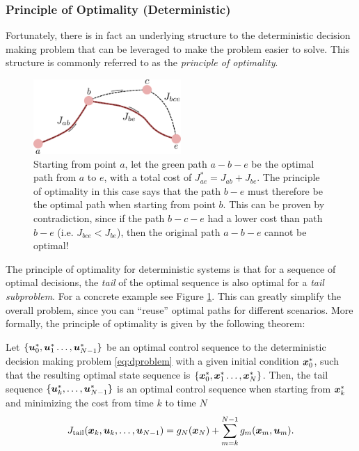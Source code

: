 \subsubsection{Principle of Optimality (Deterministic)}
Fortunately, there is in fact an underlying structure to the deterministic decision making problem that can be leveraged to make the problem easier to solve. This structure is commonly referred to as the \textit{principle of optimality}.
\begin{figure}[ht]
    \centering
    \includegraphics[width=0.5\textwidth]{tex/figs/ch22_figs/princopt1.png}
    \caption{Starting from point $a$, let the green path $a-b-e$ be the optimal path from $a$ to $e$, with a total cost of $J^*_{ae} = J_{ab}+J_{be}$. The principle of optimality in this case says that the path $b-e$ must therefore be the optimal path when starting from point $b$. This can be proven by contradiction, since if the path $b-c-e$ had a lower cost than path $b-e$ (i.e. $J_{bce} < J_{be}$), then the original path $a-b-e$ cannot be optimal!}
    \label{fig:princopt1}
\end{figure}

The principle of optimality for deterministic systems is that for a sequence of optimal decisions, the \textit{tail} of the optimal sequence is also optimal for a \textit{tail subproblem}. For a concrete example see Figure \ref{fig:princopt1}. This can greatly simplify the overall problem, since you can ``reuse'' optimal paths for different scenarios. More formally, the principle of optimality is given by the following theorem:
\begin{theorem}
Let $\{\bm{u}_0^*, \bm{u}_1^* \dots, \bm{u}_{N-1}^*\}$ be an optimal control sequence to the deterministic decision making problem \eqref{eq:dproblem} with a given initial condition $\bm{x}^*_0$, such that the resulting optimal state sequence is $\{\bm{x}_0^*, \bm{x}_1^* \dots, \bm{x}_{N}^*\}$. Then, the tail sequence $\{\bm{u}_k^*, \dots, \bm{u}_{N-1}^*\}$ is an optimal control sequence when starting from $\bm{x}^*_k$ and minimizing the cost from time $k$ to time $N$
\begin{equation*}
J_{\text{tail}}(\bm{x}_k, \bm{u}_k, \dots, \bm{u}_{N-1}) = g_N(\bm{x}_N) + \sum_{m=k}^{N-1} g_m(\bm{x}_m, \bm{u}_m).
\end{equation*}
\end{theorem}

